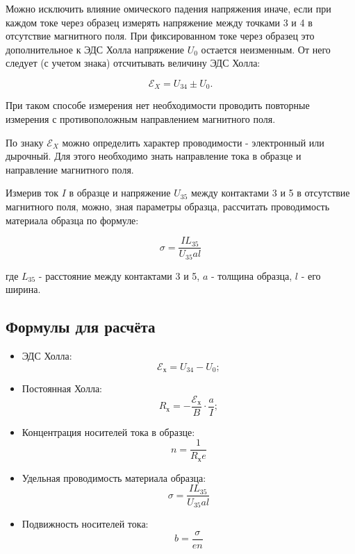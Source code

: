 \documentclass[a4paper]{article}
\theoremstyle{definition}
\theoremstyle{remark}
\begin{document}
  	Можно исключить влияние омического падения напряжения иначе, если при каждом токе через образец измерять напряжение между точками 3 и 4 в отсутствие магнитного поля. При фиксированном токе через образец это дополнительное к ЭДС Холла напряжение $U_{0}$ остается неизменным. От него следует (с учетом
  	знака) отсчитывать величину ЭДС Холла: 
  	
  	$$\mathscr{E}_{X} = U_{34} \pm U_{0}.$$
  	
  	При таком способе измерения нет необходимости проводить повторные измерения с противоположным направлением магнитного поля.
  	
  	
  	По знаку $\mathscr{E}_{X}$ можно определить характер проводимости - электронный или дырочный. Для этого необходимо знать направление тока в образце и направление
  	магнитного поля.
  	
  	Измерив ток $I$ в образце и напряжение $U_{35}$ между контактами 3 и 5 в отсутствие магнитного поля, можно, зная параметры образца, рассчитать проводимость материала образца по формуле:
  	
  \begin{equation*}
  	\sigma=\dfrac{IL_{35}}{U_{35}al}
  \end{equation*}
  	
  	где $L_{35}$ - расстояние между контактами 3 и 5, $a$ - толщина образца, $l$ - его ширина.

\subsection{Формулы для расчёта}

\begin{itemize}
    \item
        ЭДС Холла:
        \begin{equation}
            \mathscr{E_\text{х}} = U_{34} - U_0;
        \end{equation}
    \item
        Постоянная Холла:
        \begin{equation}
            R_\text{х} = -\frac{\mathscr{E_\text{х}}}{B} \cdot \frac{a}{I};
        \end{equation}
    \item
        Концентрация носителей тока в образце:
        \begin{equation}
            n = \frac{1}{R_\text{х} e}
        \end{equation}
    \item
        Удельная проводимость материала образца:
        \begin{equation}
            \sigma = \frac{I L_{35}}{U_{35}al}
        \end{equation}
    \item
        Подвижность носителей тока:
        \begin{equation}
            b = \frac{\sigma}{en}
        \end{equation}
    
\end{itemize}
\end{document}
